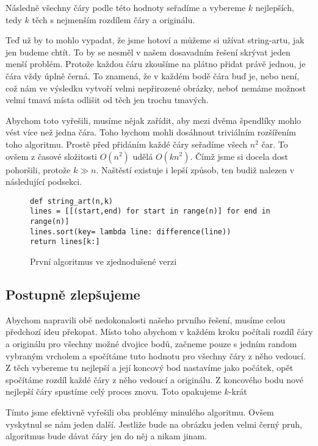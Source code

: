 \documentclass{article}
\begin{document}
Následně všechny čáry podle této hodnoty seřadíme a vybereme $k$ nejlepších, 
tedy $k$ těch s nejmenším rozdílem čáry a originálu.

Teď už by to mohlo vypadat, že jsme hotoví a můžeme si užívat string-artu, jak
jen budeme chtít. To by se nesměl v našem dosavadním řešení skrývat jeden menší
problém. Protože každou čáru zkoušíme na plátno přidat právě jednou, je čára vždy
úplně černá. To znamená, že v každém bodě čára buď je, nebo není, což nám ve
výsledku vytvoří velmi nepřirozené obrázky, neboť nemáme možnost velmi tmavá místa
odlišit od těch jen trochu tmavých.

Abychom toto vyřešili, musíme nějak zařídit, aby mezi dvěma špendlíky mohlo vést
více než jedna čára. Toho bychom mohli dosáhnout triviálním rozšířením toho
algoritmu. Prostě před přidáním každé čáry seřadíme všech $n^2$ čar. To ovšem z
časové složitosti $O(n^2)$ udělá $O(kn^2)$. Čímž jsme si docela dost pohoršili,
protože $k \gg n$. Naštěstí existuje i lepší způsob, ten budiž nalezen v
následující podsekci.


\begin{figure}[!ht]
\label{fig:first}
\begin{mdframed}[style=MyFrame]
\begin{lstlisting}[style=metoo]
def string_art(n,k)
lines = [[(start,end) for start in range(n)] for end in range(n)]
lines.sort(key= lambda line: difference(line))
return lines[k:]
\end{lstlisting}
\end{mdframed}
\caption{První algoritmus ve zjednodušené verzi}
\end{figure}

\subsection{Postupně zlepšujeme}
\label{ssec:postupne-zlepsujeme}

Abychom napravili obě nedokonalosti našeho prvního řešení, musíme celou předchozí
ideu překopat. Místo toho abychom v každém kroku počítali rozdíl čáry a originálu 
pro všechny možné dvojice bodů, začneme pouze s jedním random vybraným vrcholem a 
spočítáme tuto hodnotu pro všechny čáry z něho vedoucí. Z těch vybereme tu nejlepší
a její koncový bod nastavíme jako počátek, opět spočítáme rozdíl každé čáry z něho
vedoucí a originálu. Z koncového bodu nové nejlepší čáry spustíme celý proces znovu.
Toto opakujeme $k$-krát 

Tímto jsme efektivně vyřešili oba problémy minulého
algoritmu. Ovšem vyskytnul se nám jeden další. Jestliže bude na obrázku jeden
velmi černý pruh, algoritmus bude dávat čáry jen do něj a nikam jinam. 
\end{document}
